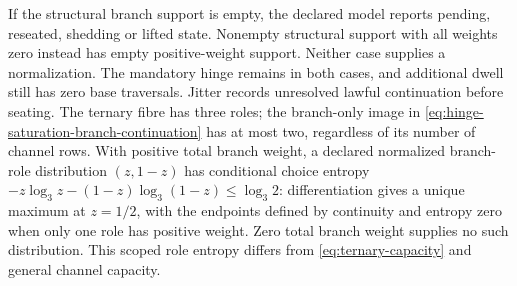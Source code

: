 If the structural branch support is empty, the declared model reports pending,
reseated, shedding or lifted state. Nonempty structural support with all weights
zero instead has empty positive-weight support. Neither case supplies a
normalization. The mandatory hinge remains in both cases, and additional dwell
still has zero base traversals. Jitter records unresolved lawful continuation
before seating.
The ternary fibre has three roles; the branch-only image in
\eqref{eq:hinge-saturation-branch-continuation} has at most two, regardless of
its number of channel rows. With positive total branch weight, a declared
normalized branch-role distribution \((z,1-z)\) has conditional choice entropy
\(-z\log_3z-(1-z)\log_3(1-z)\le\log_3 2\): differentiation gives a unique
maximum at \(z=1/2\), with the endpoints defined by continuity and entropy zero
when only one role has positive weight. Zero total branch weight supplies no
such distribution. This scoped role entropy differs from
\eqref{eq:ternary-capacity} and general channel capacity.

